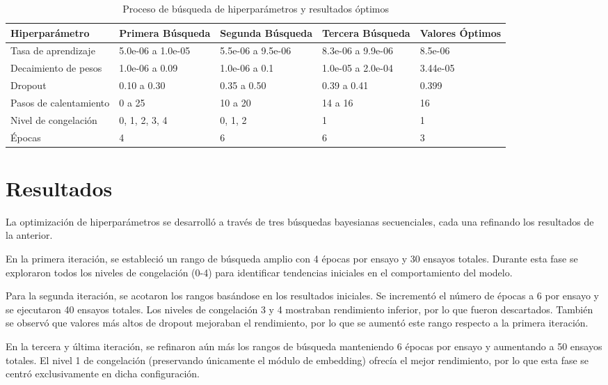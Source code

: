 \begin{table}[htbp]
    \centering
    \caption{Proceso de búsqueda de hiperparámetros y resultados óptimos}
    \label{tabla:hiperparametros_entrenamiento}
    \begin{tabular}{|l|p{2.6cm}|p{2.6cm}|p{2.6cm}|p{2cm}|}
        \hline
        \textbf{Hiperparámetro} & \textbf{Primera Búsqueda} & \textbf{Segunda Búsqueda} & \textbf{Tercera Búsqueda} & \textbf{Valores Óptimos} \\
        \hline
        Tasa de aprendizaje & 5.0e-06 a 1.0e-05 & 5.5e-06 a 9.5e-06 & 8.3e-06 a 9.9e-06 & 8.5e-06 \\
        \hline
        Decaimiento de pesos & 1.0e-06 a 0.09 & 1.0e-06 a 0.1 & 1.0e-05 a 2.0e-04 & 3.44e-05 \\
        \hline
        Dropout & 0.10 a 0.30 & 0.35 a 0.50 & 0.39 a 0.41 & 0.399 \\
        \hline
        Pasos de calentamiento & 0 a 25 & 10 a 20 & 14 a 16 & 16 \\
        \hline
        Nivel de congelación & 0, 1, 2, 3, 4 & 0, 1, 2 & 1 & 1 \\
        \hline
        Épocas & 4 & 6 & 6 & 3 \\
        \hline
    \end{tabular}
\end{table}

\section{Resultados}
La optimización de hiperparámetros se desarrolló a través de tres búsquedas bayesianas secuenciales, cada una refinando los resultados de la anterior.

En la primera iteración, se estableció un rango de búsqueda amplio con 4 épocas por ensayo y 30 ensayos totales. Durante esta fase se exploraron todos los niveles de congelación (0-4) para identificar tendencias iniciales en el comportamiento del modelo.

Para la segunda iteración, se acotaron los rangos basándose en los resultados iniciales. Se incrementó el número de épocas a 6 por ensayo y se ejecutaron 40 ensayos totales. Los niveles de congelación 3 y 4 mostraban rendimiento inferior, por lo que fueron descartados. También se observó que valores más altos de dropout mejoraban el rendimiento, por lo que se aumentó este rango respecto a la primera iteración.

En la tercera y última iteración, se refinaron aún más los rangos de búsqueda manteniendo 6 épocas por ensayo y aumentando a 50 ensayos totales. El nivel 1 de congelación (preservando únicamente el módulo de embedding) ofrecía el mejor rendimiento, por lo que esta fase se centró exclusivamente en dicha configuración.

